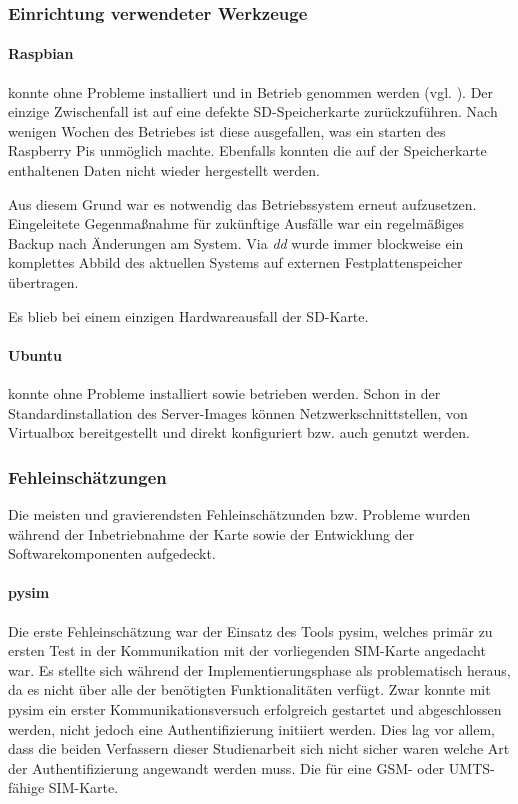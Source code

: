 		\subsubsection{Einrichtung verwendeter Werkzeuge}
			\paragraph{Raspbian} konnte ohne Probleme installiert und in
			Betrieb genommen werden (vgl. ). Der einzige Zwischenfall ist auf eine
			defekte SD-Speicherkarte zurückzuführen. Nach wenigen Wochen
			des Betriebes ist diese ausgefallen, was ein starten des
			Raspberry Pis unmöglich machte. Ebenfalls konnten die auf der
			Speicherkarte enthaltenen Daten nicht wieder hergestellt werden.

			Aus diesem Grund war es notwendig das Betriebssystem erneut aufzusetzen.
			Eingeleitete Gegenmaßnahme für zukünftige Ausfälle war ein regelmäßiges Backup
			nach Änderungen am System. Via \textit{dd} wurde immer blockweise ein komplettes Abbild
			des aktuellen Systems auf externen Festplattenspeicher übertragen.

			Es blieb bei einem einzigen Hardwareausfall der SD-Karte.

			\paragraph{Ubuntu} konnte ohne Probleme installiert sowie betrieben werden.
			Schon in der Standardinstallation des Server-Images können Netzwerkschnittstellen,
			von Virtualbox bereitgestellt und direkt konfiguriert bzw. auch genutzt werden.

		\subsubsection{Fehleinschätzungen}
		Die meisten und gravierendsten Fehleinschätzunden bzw. Probleme
		wurden während der Inbetriebnahme der Karte sowie der Entwicklung
		der Softwarekomponenten aufgedeckt.

		\paragraph{pysim}
		Die erste Fehleinschätzung war der Einsatz des Tools pysim, welches
		primär zu ersten Test in der Kommunikation mit der vorliegenden
		SIM-Karte angedacht war. Es stellte sich während der Implementierungsphase
		als problematisch heraus, da es nicht über alle der benötigten 
		Funktionalitäten verfügt. Zwar konnte mit pysim ein erster
		Kommunikationsversuch erfolgreich gestartet und abgeschlossen werden,
		nicht jedoch eine Authentifizierung initiiert werden. Dies lag
		vor allem, dass die beiden Verfassern dieser Studienarbeit sich nicht
		sicher waren welche Art der Authentifizierung angewandt werden muss.
		Die für eine GSM- oder UMTS-fähige SIM-Karte.

